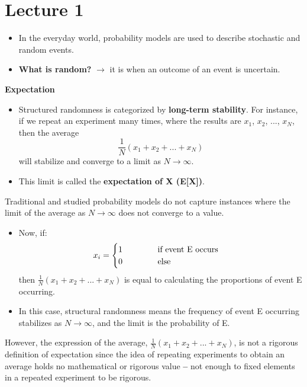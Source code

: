 \section{Lecture 1}

\begin{itemize}
    \item In the everyday world, probability models are used to describe stochastic and random events.
    \item \textbf{What is random?} $\longrightarrow$ it is when an outcome of an event is uncertain.
\end{itemize}

\begin{defn}\textbf{Expectation}
    \begin{itemize}
        \item Structured randomness is categorized by \textbf{long-term stability}. For instance, if we repeat an experiment many times, where the results are $x_1$, $x_2$, ..., $x_N$, then the average
        \begin{equation*}
            \frac{1}{N}(x_1 + x_2 + ... + x_N)
        \end{equation*}
        will stabilize and converge to a limit as $N \rightarrow \infty$.
        \item This limit is called the \textbf{expectation of X (E[X])}.
    \end{itemize}
\end{defn}

\begin{rem}
    Traditional and studied probability models do not capture instances where the limit of the average as $N \rightarrow \infty$ does not converge to a value.
\end{rem}

\begin{itemize}
    \item Now, if:
    \begin{equation*}
        x_i = \begin{cases}
            1 \hspace{1.5cm} \text{if event E occurs} \\
            0 \hspace{1.5cm} \text{else}
        \end{cases}
    \end{equation*}
    then $\frac{1}{N}(x_1 + x_2 + ... + x_N)$ is equal to calculating the proportions of event E occurring.
    \item In this case, structural randomness means the frequency of event E occurring stabilizes as $N \rightarrow \infty$, and the limit is the probability of E.
\end{itemize}


\begin{rem}
    However, the expression of the average, $\frac{1}{N}(x_1 + x_2 + ... + x_N)$, is not a rigorous definition of expectation since the idea of repeating experiments to obtain an average holds no mathematical or rigorous value \textbf{--}
not enough to fixed elements in a repeated experiment to be rigorous.
\end{rem}
